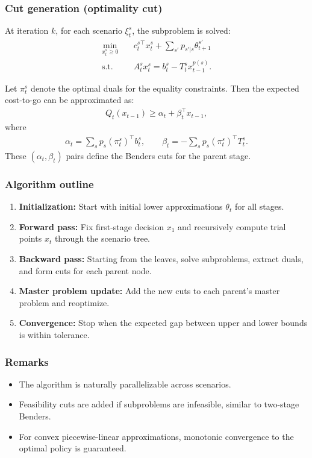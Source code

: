 \documentclass{beamer}
\begin{document}
\begin{frame}
\frametitle{Cut generation (optimality cut)}

At iteration $k$, for each scenario $\xi_t^s$, the subproblem is solved:
\begin{align*}
	\min_{x_t^s \ge 0} \quad & c_t^s{}^\top x_t^s + \sum_{s'} p_{s'|s} \theta_{t+1}^{s'} \\
	\text{s.t.} \quad & A_t^s x_t^s = b_t^s - T_t^s x_{t-1}^{p(s)}.
\end{align*}

Let $\pi_t^s$ denote the optimal duals for the equality constraints. Then the expected cost-to-go can be approximated as:
\begin{align}
	Q_t(x_{t-1}) \ge \alpha_t + \beta_t^\top x_{t-1},
\end{align}
where
\begin{align}
	\alpha_t = \sum_s p_s (\pi_t^s)^\top b_t^s, \qquad
	\beta_t = - \sum_s p_s (\pi_t^s)^\top T_t^s.
\end{align}
These $(\alpha_t, \beta_t)$ pairs define the Benders cuts for the parent stage.

\end{frame}

\begin{frame}
	\frametitle{Algorithm outline}

\begin{enumerate}
	\item \textbf{Initialization:} Start with initial lower approximations $\theta_t$ for all stages.
	\item \textbf{Forward pass:} Fix first-stage decision $x_1$ and recursively compute trial points $x_t$ through the scenario tree.
	\item \textbf{Backward pass:} Starting from the leaves, solve subproblems, extract duals, and form cuts for each parent node.
	\item \textbf{Master problem update:} Add the new cuts to each parent’s master problem and reoptimize.
	\item \textbf{Convergence:} Stop when the expected gap between upper and lower bounds is within tolerance.
\end{enumerate}

\end{frame}

\begin{frame}
\frametitle{Remarks}

\begin{itemize}
	\item The algorithm is naturally parallelizable across scenarios.
	\item Feasibility cuts are added if subproblems are infeasible, similar to two-stage Benders.
	\item For convex piecewise-linear approximations, monotonic convergence to the optimal policy is guaranteed.
\end{itemize}

\end{frame}
\end{document}
